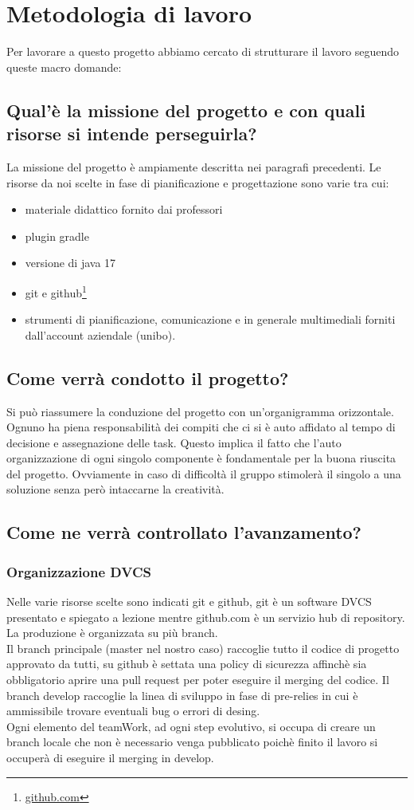 \documentclass[a4paper,12pt]{report}
\begin{document}
\section{Metodologia di lavoro}
Per lavorare
a questo progetto abbiamo cercato di strutturare il lavoro seguendo queste macro domande:
\subsection{Qual'è la missione del progetto e con quali risorse si intende perseguirla?}
La missione del progetto è ampiamente descritta nei paragrafi precedenti.
Le risorse da noi scelte in fase di pianificazione e progettazione sono varie tra cui:
\begin{itemize}
    \item materiale didattico fornito dai professori
    \item plugin gradle
    \item versione di java 17
    \item git e github\footnote{\url{github.com}}
    \item strumenti di pianificazione, comunicazione e in generale multimediali forniti dall'account aziendale (unibo).
\end{itemize}

\subsection{Come verrà condotto il progetto?}
Si può riassumere la conduzione del progetto con un'organigramma orizzontale.
Ognuno ha piena responsabilità dei compiti che ci si è auto affidato al tempo di decisione e assegnazione delle task.
Questo implica il fatto che l'auto organizzazione di ogni singolo componente è fondamentale per la buona riuscita del progetto.
Ovviamente in caso di difficoltà il gruppo stimolerà il singolo a una soluzione senza però intaccarne la creatività.
\subsection{Come ne verrà controllato l'avanzamento?}
\subsubsection{Organizzazione DVCS}
Nelle varie risorse scelte sono indicati git e github, git è un software DVCS presentato e spiegato a lezione mentre github.com è un servizio
hub di repository.
La produzione è organizzata su più branch.
\\Il branch principale (master nel nostro caso) raccoglie tutto il codice di progetto approvato da tutti, su github è settata una policy
di sicurezza affinchè sia obbligatorio aprire una pull request per poter eseguire il merging del codice.
Il branch develop raccoglie la linea di sviluppo in fase di pre-relies in cui è ammissibile trovare eventuali bug o errori di desing.
\\Ogni elemento del teamWork, ad ogni step evolutivo, si occupa di creare un branch locale che non è necessario venga pubblicato poichè finito
il lavoro si occuperà di eseguire il merging  in develop.
\end{document}
